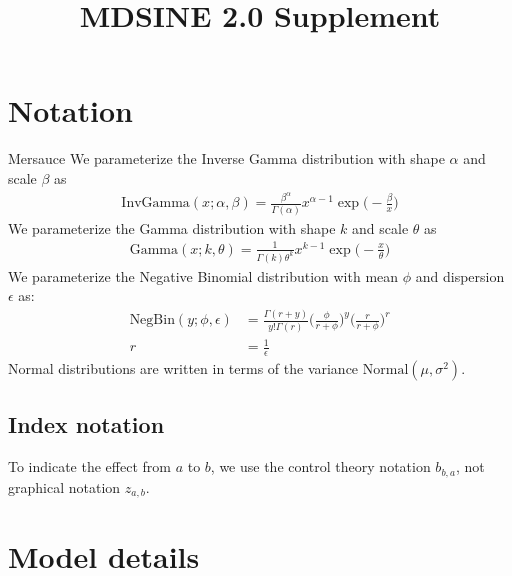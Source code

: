 \documentclass{article}
\title{MDSINE 2.0 Supplement}
\newcommand{\Normaldist}{\text{Normal}}
\newcommand{\InvGammadist}{\text{InvGamma}}
\newcommand{\Gammadist}{\text{Gamma}}
\newcommand{\NegBindist}{\text{NegBin}}
\begin{document}
\maketitle
\tableofcontents
\newpage

\section{Notation}
Mersauce We parameterize the Inverse Gamma distribution with shape $\alpha$ and scale $\beta$ as
\begin{align}
    \InvGammadist(x ; \alpha, \beta) =
        \frac{\beta^{\alpha}}{\Gamma({\alpha})}
        x^{\alpha-1}
        \exp{\Big( -\frac{\beta}{x} \Big)}
\end{align}
We parameterize the Gamma distribution with shape $k$ and scale $\theta$ as
\begin{align}
    \Gammadist(x ; k, \theta) =
        \frac{1}{\Gamma(k)\theta^k} x^{k-1}
        \exp{\Big( -\frac{x}{\theta} \Big)}
\end{align}
We parameterize the Negative Binomial distribution with mean $\phi$ and dispersion $\epsilon$ as:
\begin{align}
    \NegBindist(y;\phi,\epsilon) & =
        \frac{\Gamma(r+y)}{y!\Gamma(r)}
        \Big(
            \frac{\phi}{r+\phi}
        \Big)^y
        \Big(
            \frac{r}{r+\phi}
        \Big)^r \\
    r & = \frac{1}{\epsilon}
\end{align}
Normal distributions are written in terms of the variance $\Normaldist(\mu, \sigma^2)$.

\subsection{Index notation}
To indicate the effect from $a$ to $b$, we use the control theory notation $b_{b,a}$, not graphical notation $z_{a,b}$.


\section{Model details}
\label{section:model details}
\end{document}
